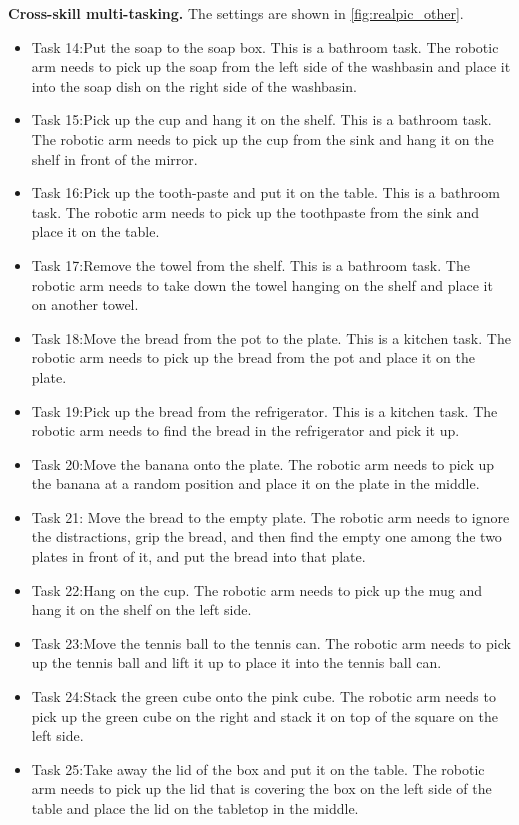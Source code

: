 \textbf{Cross-skill multi-tasking.} The settings are shown in  \ref{fig:realpic_other}.
\begin{itemize}
    \item  Task 14:Put the soap to the soap box. This is a bathroom task. The robotic arm needs to pick up the soap from the left side of the washbasin and place it into the soap dish on the right side of the washbasin. 
    \item  Task 15:Pick up the cup and hang it on the shelf. This is a bathroom task. The robotic arm needs to pick up the cup from the sink and hang it on the shelf in front of the mirror. 
    \item  Task 16:Pick up the tooth-paste and put it on the table. This is a bathroom task. The robotic arm needs to pick up the toothpaste from the sink and place it on the table.
    \item  Task 17:Remove the towel from the shelf. This is a bathroom task. The robotic arm needs to take down the towel hanging on the shelf and place it on another towel. 
    \item Task 18:Move the bread from the pot to the plate. This is a kitchen task. The robotic arm needs to pick up the bread from the pot and place it on the plate. 
    \item Task 19:Pick up the bread from the refrigerator. This is a kitchen task. The robotic arm needs to find the bread in the refrigerator and pick it up. 
    \item Task 20:Move the banana onto the plate. The robotic arm needs to pick up the banana at a random position and place it on the plate in the middle. 
    \item  Task 21: Move the bread to the empty plate. The robotic arm needs to ignore the distractions, grip the bread, and then find the empty one among the two plates in front of it, and put the bread into that plate. 
    \item  Task 22:Hang on the cup. The robotic arm needs to pick up the mug and hang it on the shelf on the left side. 
    \item Task 23:Move the tennis ball to the tennis can. The robotic arm needs to pick up the tennis ball and lift it up to place it into the tennis ball can. 
    \item Task 24:Stack the green cube onto the pink cube. The robotic arm needs to pick up the green cube on the right and stack it on top of the square on the left side. 
    \item  Task 25:Take away the lid of the box and put it on the table. The robotic arm needs to pick up the lid that is covering the box on the left side of the table and place the lid on the tabletop in the middle. 

\end{itemize}

